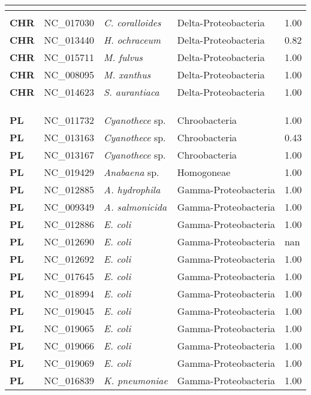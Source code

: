 \begin{adjustwidth}{-3cm}{2cm}
{\begin{supertabular}{>{\bfseries}l|p{0.1\textwidth}p{0.14\textwidth}l|l}
\\
\hline\\
CHR & NC\_017030 & \textit{C. coralloides} & Delta-Proteobacteria & 1.00\\
CHR & NC\_013440 & \textit{H. ochraceum} & Delta-Proteobacteria & 0.82\\
CHR & NC\_015711 & \textit{M. fulvus} & Delta-Proteobacteria & 1.00\\
CHR & NC\_008095 & \textit{M. xanthus} & Delta-Proteobacteria & 1.00\\
CHR & NC\_014623 & \textit{S. aurantiaca} & Delta-Proteobacteria & 1.00\\
\\
\\
\hline\\
PL & NC\_011732 & \textit{Cyanothece} sp. & Chroobacteria & 1.00\\
PL & NC\_013163 & \textit{Cyanothece} sp. & Chroobacteria & 0.43\\
PL & NC\_013167 & \textit{Cyanothece} sp. & Chroobacteria & 1.00\\
PL & NC\_019429 & \textit{Anabaena} sp. & Homogoneae & 1.00\\
PL & NC\_012885 & \textit{A. hydrophila} & Gamma-Proteobacteria & 1.00\\
PL & NC\_009349 & \textit{A. salmonicida} & Gamma-Proteobacteria & 1.00\\
PL & NC\_012886 & \textit{E. coli} & Gamma-Proteobacteria & 1.00\\
PL & NC\_012690 & \textit{E. coli} & Gamma-Proteobacteria & nan\\
PL & NC\_012692 & \textit{E. coli} & Gamma-Proteobacteria & 1.00\\
PL & NC\_017645 & \textit{E. coli} & Gamma-Proteobacteria & 1.00\\
PL & NC\_018994 & \textit{E. coli} & Gamma-Proteobacteria & 1.00\\
PL & NC\_019045 & \textit{E. coli} & Gamma-Proteobacteria & 1.00\\
PL & NC\_019065 & \textit{E. coli} & Gamma-Proteobacteria & 1.00\\
PL & NC\_019066 & \textit{E. coli} & Gamma-Proteobacteria & 1.00\\
PL & NC\_019069 & \textit{E. coli} & Gamma-Proteobacteria & 1.00\\
PL & NC\_016839 & \textit{K. pneumoniae} & Gamma-Proteobacteria & 1.00\\

\end{supertabular}}
\end{adjustwidth}
